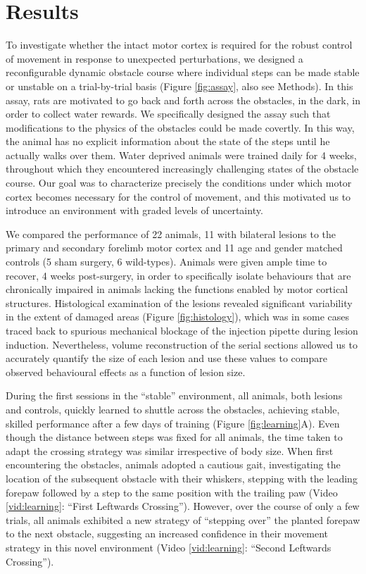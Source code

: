 \section{Results}

To investigate whether the intact motor cortex is required for the robust control of movement in response to unexpected perturbations, we designed a reconfigurable dynamic obstacle course where individual steps can be made stable or unstable on a trial-by-trial basis (Figure \ref{fig:assay}, also see Methods). In this assay, rats are motivated to go back and forth across the obstacles, in the dark, in order to collect water rewards. We specifically designed the assay such that modifications to the physics of the obstacles could be made covertly. In this way, the animal has no explicit information about the state of the steps until he actually walks over them. Water deprived animals were trained daily for 4 weeks, throughout which they encountered increasingly challenging states of the obstacle course. Our goal was to characterize precisely the conditions under which motor cortex becomes necessary for the control of movement, and this motivated us to introduce an environment with graded levels of uncertainty.

We compared the performance of 22 animals, 11 with bilateral lesions to the primary and secondary forelimb motor cortex and 11 age and gender matched controls (5 sham surgery, 6 wild-types). Animals were given ample time to recover, 4 weeks post-surgery, in order to specifically isolate behaviours that are chronically impaired in animals lacking the functions enabled by motor cortical structures. Histological examination of the lesions revealed significant variability in the extent of damaged areas (Figure \ref{fig:histology}), which was in some cases traced back to spurious mechanical blockage of the injection pipette during lesion induction. Nevertheless, volume reconstruction of the serial sections allowed us to accurately quantify the size of each lesion and use these values to compare observed behavioural effects as a function of lesion size.

During the first sessions in the ``stable'' environment, all animals, both lesions and controls, quickly learned to shuttle across the obstacles, achieving stable, skilled performance after a few days of training (Figure \ref{fig:learning}A). Even though the distance between steps was fixed for all animals, the time taken to adapt the crossing strategy was similar irrespective of body size. When first encountering the obstacles, animals adopted a cautious gait, investigating the location of the subsequent obstacle with their whiskers, stepping with the leading forepaw followed by a step to the same position with the trailing paw (Video \ref{vid:learning}: ``First Leftwards Crossing''). However, over the course of only a few trials, all animals exhibited a new strategy of ``stepping over'' the planted forepaw to the next obstacle, suggesting an increased confidence in their movement strategy in this novel environment (Video \ref{vid:learning}: ``Second Leftwards Crossing'').

